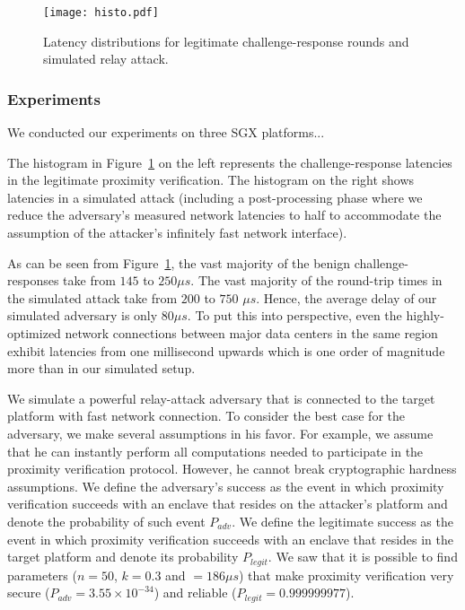 \begin{figure}[t]
  \centering
    \texttt{[image: histo.pdf]} 
    \caption{Latency distributions for legitimate challenge-response rounds and simulated relay attack.}
    \label{graph:instatAttackerHisto}
\end{figure}


\subsubsection*{Experiments}

We conducted our experiments on three SGX platforms...

The histogram in Figure~\ref{graph:instatAttackerHisto} on the left represents the challenge-response latencies in the legitimate proximity verification. The histogram on the right shows latencies in a simulated attack (including a post-processing phase where we reduce the adversary's measured network latencies to half to accommodate the assumption of the attacker's infinitely fast network interface).

As can be seen from Figure~\ref{graph:instatAttackerHisto}, the vast majority of the benign challenge-responses take from $145$ to $250 \mu s$. The vast majority of the round-trip times in the simulated attack take from $200$ to $750$ $\mu s$. Hence, the average delay of our simulated adversary is only $80 \mu s$. To put this into perspective, even the highly-optimized network connections between major data centers in the same region exhibit latencies from one millisecond upwards which is one order of magnitude more than in our simulated setup.

We simulate a powerful relay-attack adversary that is connected to the target platform with fast network connection. To consider the best case for the adversary, we make several assumptions in his favor. For example, we assume that he can instantly perform all computations needed to participate in the proximity verification protocol. However, he cannot break cryptographic hardness assumptions. We define the adversary's success as the event in which proximity verification succeeds with an enclave that resides on the attacker's platform and denote the probability of such event $P_{adv}$. We define the legitimate success as the event in which proximity verification succeeds with an enclave that resides in the target platform and denote its probability $P_{legit}$. We saw that it is possible to find parameters ($n=50$, $k=0.3$ and \proximitee$=186 \mu s$) that make proximity verification very secure ($P_{adv}=3.55\times 10^{-34}$) and reliable ($P_{legit}=0.999999977$).





